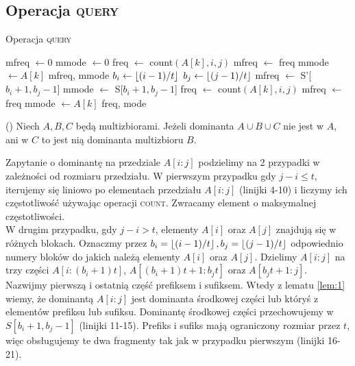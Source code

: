 \subsection{Operacja \textsc{query}}
\begin{algorithm}[t]
    \caption{Operacja \textsc{query}}
    \label{alg:kms-query}
    \begin{algorithmic}[1]
            \State mfreq $\gets 0$
            \State mmode $\gets 0$
                    \State freq $\gets$ count$(A[k], i, j)$
                        \State mfreq $\gets$ freq
                        \State mmode $\gets A[k]$
                    \EndIf
                \EndFor
                \State \Return mfreq, mmode
            \EndIf
            \State $b_i \gets \left\lfloor(i-1)/t\right\rfloor$
            \State $b_j \gets \left\lfloor(j-1)/t\right\rfloor$
                \State mfreq $\gets$ S'[$b_i+1,b_j-1$]
                \State mmode $\gets$ S[$b_i+1,b_j-1$]
            \EndIf
                    \State freq $\gets$ count$(A[k], i, j)$
                        \State mfreq $\gets$ freq
                        \State mmode $\gets A[k]$
                    \EndIf
                \EndFor
            \State \Return freq, mode
        \EndFunction
    \end{algorithmic}
\end{algorithm}
\begin{lemma}
\label{lem:1}
(\cite{kriz05}) Niech $A, B, C$ będą multizbiorami. Jeżeli dominanta $A \cup B \cup C$ nie jest w $A$, ani w $C$ to jest nią dominanta multizbioru $B$.
\end{lemma} 

\hspace{-1em}Zapytanie o dominantę na przedziale $A[i:j]$ podzielimy na 2 przypadki w zależności od rozmiaru przedziału.
W pierwszym przypadku gdy $j-i \le t$, iterujemy się liniowo po elementach przedziału
$A[i:j]$ (linijki 4-10) i liczymy ich częstotliwość używając operacji \textsc{count}. Zwracamy element o maksymalnej częstotliwości. \\
W drugim przypadku, gdy $j-i > t$, elementy $A[i]$ oraz $A[j]$ znajdują się w różnych blokach. Oznaczmy przez $b_i=\left\lfloor(i-1)/t\right\rfloor, b_j=\left\lfloor(j-1)/t\right\rfloor$ odpowiednio numery bloków do jakich należą elementy $A[i]$ oraz $A[j]$. Dzielimy $A[i:j]$ na trzy części $A[i:(b_i+1)t]$, $A[(b_i+1)t+1:b_jt]$ oraz $A[b_jt+1:j]$. Nazwijmy pierwszą i ostatnią część prefiksem i sufiksem. Wtedy z lematu \ref{lem:1} wiemy, że dominantą $A[i:j]$ jest dominanta środkowej części lub któryś z elementów prefiksu lub sufiksu. Dominantę środkowej części przechowujemy w $S[b_i+1,b_j-1]$ (linijki 11-15). Prefiks i sufiks mają ograniczony rozmiar przez $t$, więc obsługujemy te dwa fragmenty tak jak w przypadku pierwszym (linijki 16-21). 
